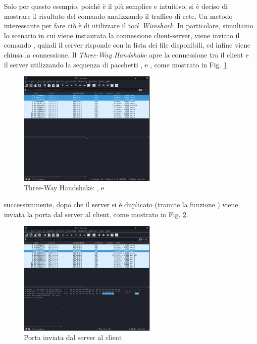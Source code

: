 Solo per questo esempio, poichè è il più semplice e intuitivo, si è deciso di mostrare il risultato del comando  analizzando il traffico di rete.
Un metodo interessante per fare ciò è di utilizzare il tool \textit{Wireshark}.
In particolare, simuliamo lo scenario in cui viene instaurata la connessione client-server, viene inviato il comando , quindi il server risponde con la lista dei file disponibili, ed infine viene chiusa la connessione.
Il \textit{Three-Way Handshake} apre la connessione tra il client e il server utilizzando la sequenza di pacchetti ,  e , come mostrato in Fig. \ref{fig:syn-synack-ack}.

\begin{figure}[h]
    \centering
    \includegraphics[width=0.6\textwidth]{imgs/03/syn-synack-ack.png}
    \caption{Three-Way Handshake: ,  e }
    \label{fig:syn-synack-ack}
\end{figure}

successivamente, dopo che il server si è duplicato (tramite la funzione ) viene inviata la porta  dal server al client, come mostrato in Fig. \ref{fig:port-6969}.

\begin{figure}[h]
    \centering
    \includegraphics[width=0.6\textwidth]{imgs/03/port.png}
    \caption{Porta  inviata dal server al client}
    \label{fig:port-6969}
\end{figure}

